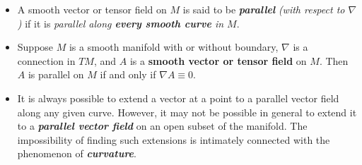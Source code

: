 \documentclass[11pt]{article}
\begin{document}
\begin{itemize}
\item \begin{remark}
A smooth vector or tensor field on $M$ is said to be \emph{\textbf{parallel}} \emph{(with respect to $\nabla$)} if it is \emph{parallel along \textbf{every smooth curve} in $M$}. 
\end{remark}

\item \begin{proposition}
Suppose $M$ is a smooth manifold with or without boundary, $\nabla$ is a connection in $TM$, and $A$ is a \textbf{smooth vector or tensor field} on $M$. Then $A$ is
parallel on $M$ if and only if $\nabla A \equiv 0$.
\end{proposition}

\item \begin{remark}
It is always possible to extend a vector at a point to a parallel vector field along any given curve. However, it may not be possible in general to extend it to a \emph{\textbf{parallel vector field}} on an open subset of the manifold. The impossibility of finding such extensions is intimately connected with the phenomenon of \emph{\textbf{curvature}}.
\end{remark}
\end{itemize}
\end{document}
